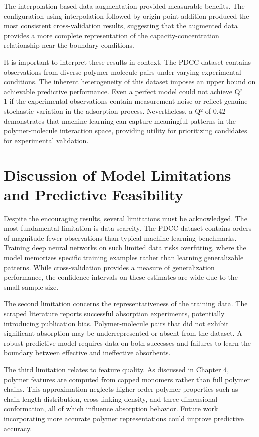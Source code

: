 The interpolation-based data augmentation provided measurable benefits. The configuration using interpolation followed by origin point addition produced the most consistent cross-validation results, suggesting that the augmented data provides a more complete representation of the capacity-concentration relationship near the boundary conditions.

It is important to interpret these results in context. The PDCC dataset contains observations from diverse polymer-molecule pairs under varying experimental conditions. The inherent heterogeneity of this dataset imposes an upper bound on achievable predictive performance. Even a perfect model could not achieve Q² = 1 if the experimental observations contain measurement noise or reflect genuine stochastic variation in the adsorption process. Nevertheless, a Q² of 0.42 demonstrates that machine learning can capture meaningful patterns in the polymer-molecule interaction space, providing utility for prioritizing candidates for experimental validation.

\section{Discussion of Model Limitations and Predictive Feasibility}
\label{sec:model_limitations}

Despite the encouraging results, several limitations must be acknowledged. The most fundamental limitation is data scarcity. The PDCC dataset contains orders of magnitude fewer observations than typical machine learning benchmarks. Training deep neural networks on such limited data risks overfitting, where the model memorizes specific training examples rather than learning generalizable patterns. While cross-validation provides a measure of generalization performance, the confidence intervals on these estimates are wide due to the small sample size.

The second limitation concerns the representativeness of the training data. The scraped literature reports successful absorption experiments, potentially introducing publication bias. Polymer-molecule pairs that did not exhibit significant absorption may be underrepresented or absent from the dataset. A robust predictive model requires data on both successes and failures to learn the boundary between effective and ineffective absorbents.

The third limitation relates to feature quality. As discussed in Chapter 4, polymer features are computed from capped monomers rather than full polymer chains. This approximation neglects higher-order polymer properties such as chain length distribution, cross-linking density, and three-dimensional conformation, all of which influence absorption behavior. Future work incorporating more accurate polymer representations could improve predictive accuracy.

